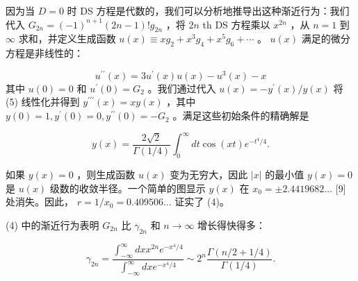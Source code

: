 \documentclass[UTF8]{article}
\begin{document}
因为当  \( D=0 \)  时 DS 方程是代数的，我们可以分析地推导出这种渐近行为：我们代入  \( G_{2 n}=(-1)^{n+1}(2 n-1) ! g_{2 n} \) ，将  \( 2 n \) th DS 方程乘以  \( x^{2 n} \) ，从  \( n=1 \)  到  \( \infty \)  求和，并定义生成函数  \( u(x) \equiv x g_{2}+x^{3} g_{4}+x^{5} g_{6}+\cdots \) 。  \( u(x) \)  满足的微分方程是非线性的：




 \[u^{\prime \prime}(x)=3 u^{\prime}(x) u(x)-u^{3}(x)-x
\]  其中  \( u(0)=0 \)  和  \( u^{\prime}(0)=G_{2} \) 。我们通过代入  \( u(x)=-y^{\prime}(x) / y(x) \)  将 (5) 线性化并得到  \( y^{\prime \prime \prime}(x)=x y(x) \) ，其中  \( y(0)=1, y^{\prime}(0)=0, y^{\prime \prime}(0)=-G_{2} \) 。满足这些初始条件的精确解是




 \[y(x)=\frac{2 \sqrt{2}}{\Gamma(1 / 4)} \int_{0}^{\infty} d t \cos (x t) e^{-t^{4} / 4} .
\] 


如果  \( y(x)=0 \) ，则生成函数  \( u(x) \)  变为无穷大，因此  \( |x| \)  的最小值  \( y(x)=0 \)  是  \( u(x) \)  级数的收敛半径。一个简单的图显示  \( y(x) \)  在  \( x_{0}= \pm 2.4419682 \ldots \)  [9] 处消失。因此， \( r=1 / x_{0}=0.409506 \ldots \)  证实了 (4)。

(4) 中的渐近行为表明  \( G_{2 n} \)  比  \( \gamma_{2 n} \)  和  \( n \rightarrow \infty \)  增长得快得多：


 \[
\gamma_{2 n}=\frac{\int_{-\infty}^{\infty} d x x^{2 n} e^{-x^{4} / 4}}{\int_{-\infty}^{\infty} d x e^{-x^{4} / 4}} \sim 2^{n} \frac{\Gamma(n / 2+1 / 4)}{\Gamma(1 / 4)} .
\] 
\end{document}
